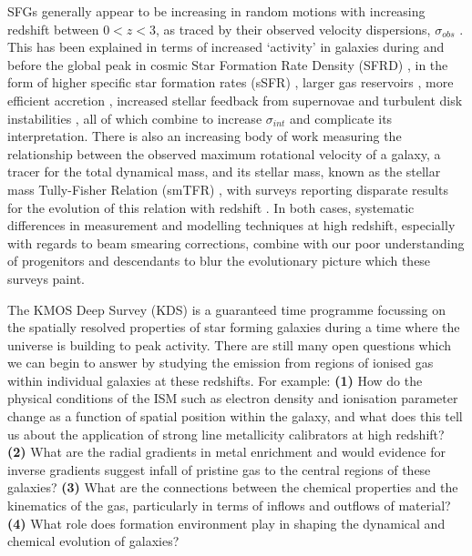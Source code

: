 \documentclass[a4paper,fleqn,usenatbib]{mn2e}
\begin{document}
SFGs generally appear to be increasing in random motions with increasing redshift between $0 < z < 3$, as traced by their observed velocity dispersions, $\sigma_{obs}$ \citep{Genzel2008,ForsterSchreiber2009,Law2009,Cresci2009,Gnerucci2011,Epinat2012,Kassin2012,Green2014,Wisnioski2015,Stott2016}.
This has been explained in terms of increased `activity' in galaxies during and before the global peak in cosmic Star Formation Rate Density (SFRD) \citep{Madau_2014}, in the form of higher specific star formation rates (sSFR) \citep{Wisnioski2015}, larger gas reservoirs \citep{Law2009,ForsterSchreiber2009,Wisnioski2015,Stott2016}, more efficient accretion \citep{Law2009}, increased stellar feedback from supernovae \citep{Kassin2012} and turbulent disk instabilities \citep{Law2009,Bournaud2007,Bournaud2016}, all of which combine to increase $\sigma_{int}$ and complicate its interpretation.
There is also an increasing body of work measuring the relationship between the observed maximum rotational velocity of a galaxy, a tracer for the total dynamical mass, and its stellar mass, known as the stellar mass Tully-Fisher Relation (smTFR) \citep{Tully1977}, with surveys reporting disparate results for the evolution of this relation with redshift \citep[e.g.][]{Puech2008,Miller2011,Gnerucci2011,Tiley2016a,Harrison2017}.
In both cases, systematic differences in measurement and modelling techniques at high redshift, especially with regards to beam smearing corrections, combine with our poor understanding of progenitors and descendants to blur the evolutionary picture which these surveys paint.


The KMOS Deep Survey (KDS) is a guaranteed time programme focussing on the spatially resolved properties of star forming galaxies during a time where the universe is building to peak activity.
There are still many open questions which we can begin to answer by studying the emission from regions of ionised gas within individual galaxies at these redshifts.
For example: \textbf{(1)} How do the physical conditions of the ISM such as electron density and ionisation parameter change as a function of spatial position within the galaxy, and what does this tell us about the application of strong line metallicity calibrators at high redshift?
\textbf{(2)} What are the radial gradients in metal enrichment and would evidence for inverse gradients suggest infall of pristine gas to the central regions of these galaxies?
\textbf{(3)} What are the connections between the chemical properties and the kinematics of the gas, particularly in terms of inflows and outflows of material?
\textbf{(4)} What role does formation environment play in shaping the dynamical and chemical evolution of galaxies? 
\end{document}

